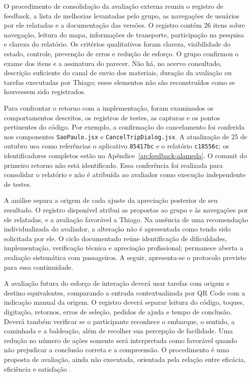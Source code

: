 O procedimento de consolidação da avaliação externa reuniu o registro de feedback, a lista de melhorias levantadas pelo grupo, as navegações de usuários por ele relatadas e a documentação das versões. O registro contém 26 itens sobre navegação, leitura do mapa, informações de transporte, participação na pesquisa e clareza do relatório. Os critérios qualitativos foram clareza, visibilidade do estado, controle, prevenção de erros e redução de esforço. O grupo confirmou o exame dos itens e a assinatura do parecer. Não há, no acervo consultado, descrição suficiente do canal de envio dos materiais, duração da avaliação ou tarefas executadas por Thiago; esses elementos não são reconstruídos como se houvessem sido registrados.

Para confrontar o retorno com a implementação, foram examinados os comportamentos descritos, os registros de testes, as capturas e os pontos pertinentes do código. Por exemplo, a confirmação do cancelamento foi conferida nos componentes \texttt{SaoPaulo.jsx} e \texttt{CancelTripDialog.jsx}. A atualização de 25 de outubro usa como referências o aplicativo \texttt{85417bc} e o relatório \texttt{c18556c}; os identificadores completos estão no Apêndice~\ref{ap:feedback-alameda}. O commit do primeiro retorno não está identificado. Essa conferência foi realizada para consolidar o relatório e não é atribuída ao avaliador como execução independente de testes.

A análise separa a origem de cada ajuste da apreciação posterior de seu resultado. O registro disponível atribui as propostas ao grupo e às navegações por ele relatadas, e a avaliação favorável a Thiago. Na ausência de uma recomendação individualizada do avaliador, a alteração não é apresentada como tendo sido solicitada por ele. O ciclo documentado reúne identificação de dificuldades, implementação, verificação técnica e apreciação profissional; permanece aberta a avaliação sistemática com passageiros. A seguir, apresenta-se o protocolo previsto para essa continuidade.

A avaliação futura do esforço de interação deverá usar tarefas com origem e destino equivalentes, comparando a entrada contextualizada por QR Code com a indicação manual da origem. O registro deverá separar leitura do código, toques, digitação, retornos, erros de seleção, pedidos de ajuda e tempo de conclusão. Deverá também verificar se o participante reconhece o embarque, o sentido, a caminhada e a baldeação, além de recolher sua percepção de facilidade. Uma redução no número de ações somente será interpretada como favorável quando não prejudicar a conclusão correta e a compreensão. O procedimento é uma proposta de avaliação, ainda não executada, orientada pela relação entre eficácia, eficiência e satisfação \citep{iso924111}.

